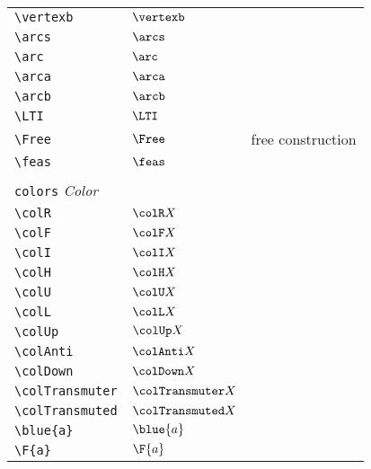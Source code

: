 \begin{longtable}{lll}
 {\color[rgb]{0.5,0.5,0.5}\texttt{\textbackslash vertexb}} & $\vertexb$ & \\ 
 {\color[rgb]{0.5,0.5,0.5}\texttt{\textbackslash arcs}} & $\arcs$ & \\ 
 {\color[rgb]{0.5,0.5,0.5}\texttt{\textbackslash arc}} & $\arc$ & \\ 
 {\color[rgb]{0.5,0.5,0.5}\texttt{\textbackslash arca}} & $\arca$ & \\ 
 {\color[rgb]{0.5,0.5,0.5}\texttt{\textbackslash arcb}} & $\arcb$ & \\ 
 {\color[rgb]{0.5,0.5,0.5}\texttt{\textbackslash LTI}} & $\LTI$ & \\ 
 {\color[rgb]{0.5,0.5,0.5}\texttt{\textbackslash Free}} & $\Free$ &  free construction\\ 
 {\color[rgb]{0.5,0.5,0.5}\texttt{\textbackslash feas}} & $\feas$ & \\ 
  &  & \\ 
 \multicolumn{3}{l}{{\color[rgb]{0.5,0.5,0.5}\texttt{colors}} \emph{Color}}\\ 
 \hline
\hline
{\color[rgb]{0.5,0.5,0.5}\texttt{\textbackslash colR}} & $\colR X$ & \\ 
 {\color[rgb]{0.5,0.5,0.5}\texttt{\textbackslash colF}} & $\colF X$ & \\ 
 {\color[rgb]{0.5,0.5,0.5}\texttt{\textbackslash colI}} & $\colI X$ & \\ 
 {\color[rgb]{0.5,0.5,0.5}\texttt{\textbackslash colH}} & $\colH X$ & \\ 
 {\color[rgb]{0.5,0.5,0.5}\texttt{\textbackslash colU}} & $\colU X$ & \\ 
 {\color[rgb]{0.5,0.5,0.5}\texttt{\textbackslash colL}} & $\colL X$ & \\ 
 {\color[rgb]{0.5,0.5,0.5}\texttt{\textbackslash colUp}} & $\colUp X$ & \\ 
 {\color[rgb]{0.5,0.5,0.5}\texttt{\textbackslash colAnti}} & $\colAnti X$ & \\ 
 {\color[rgb]{0.5,0.5,0.5}\texttt{\textbackslash colDown}} & $\colDown X$ & \\ 
 {\color[rgb]{0.5,0.5,0.5}\texttt{\textbackslash colTransmuter}} & $\colTransmuter X$ & \\ 
 {\color[rgb]{0.5,0.5,0.5}\texttt{\textbackslash colTransmuted}} & $\colTransmuted X$ & \\ 
 {\color[rgb]{0.5,0.5,0.5}\texttt{\textbackslash blue\{a\}}} & $\blue{a}$ & \\ 
 {\color[rgb]{0.5,0.5,0.5}\texttt{\textbackslash F\{a\}}} & $\F{a}$ & \\ 

\end{longtable}
